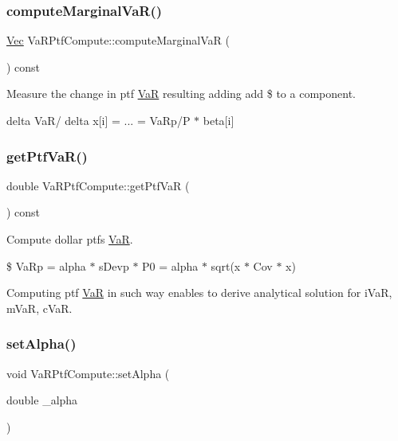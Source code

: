 \subsubsection{\texorpdfstring{compute\+Marginal\+Va\+R()}{computeMarginalVaR()}}
{\footnotesize\ttfamily \hyperlink{compute__returns__eigen_8h_a1eb6a9306ef406d7975f3cbf2e247777}{Vec} Va\+R\+Ptf\+Compute\+::compute\+Marginal\+VaR (\begin{DoxyParamCaption}{ }\end{DoxyParamCaption}) const}



Measure the change in ptf \hyperlink{classVaR}{VaR} resulting adding add \$ to a component. 

delta Va\+R/ delta x\mbox{[}i\mbox{]} = ... = Va\+Rp/P $\ast$ beta\mbox{[}i\mbox{]} \hypertarget{classVaRPtfCompute_a27523a81a27880b98660dbfca1b41873}{}\label{classVaRPtfCompute_a27523a81a27880b98660dbfca1b41873} 
\subsubsection{\texorpdfstring{get\+Ptf\+Va\+R()}{getPtfVaR()}}
{\footnotesize\ttfamily double Va\+R\+Ptf\+Compute\+::get\+Ptf\+VaR (\begin{DoxyParamCaption}{ }\end{DoxyParamCaption}) const}



Compute dollar ptf\textquotesingle{}s \hyperlink{classVaR}{VaR}. 

\$ Va\+Rp = alpha $\ast$ s\+Devp $\ast$ P0 = alpha $\ast$ sqrt(x\textquotesingle{} $\ast$ Cov $\ast$ x)

Computing ptf \hyperlink{classVaR}{VaR} in such way enables to derive analytical solution for i\+VaR, m\+VaR, c\+VaR. \hypertarget{classVaRPtfCompute_ac15972e18d15a25490f9b1ea5a86b021}{}\label{classVaRPtfCompute_ac15972e18d15a25490f9b1ea5a86b021} 
\subsubsection{\texorpdfstring{set\+Alpha()}{setAlpha()}}
{\footnotesize\ttfamily void Va\+R\+Ptf\+Compute\+::set\+Alpha (\begin{DoxyParamCaption}\item[{double}]{\+\_\+alpha }\end{DoxyParamCaption})\hspace{0.3cm}{\ttfamily [inline]}}



